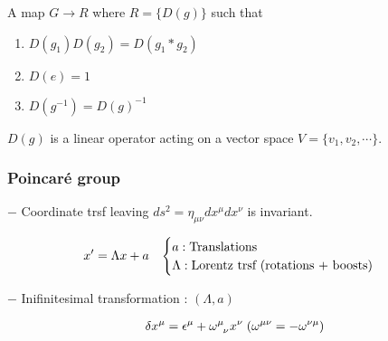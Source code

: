 \documentclass[11pt,letterpaper]{article}
\begin{document}
\VS

\begin{definition}[Representation]
	A map $G \rightarrow R$ where $R = \{D(g)\}$ such that
	\begin{enumerate}
		\item $D(g_1)D(g_2) = D(g_1*g_2)$
		\item $D(e) = 1$
		\item $D(g^{-1}) = D(g)^{-1}$
	\end{enumerate}
	
	$D(g)$ is a linear operator acting on a vector space
	$V=\{v_1, v_2, \cdots \}$.
\end{definition}

\VS\VS

\subsubsection{Poincar\'{e} group}

\vs

{$-$ Coordinate trsf leaving $ds^2 = \eta_{\mu\nu}dx^\mu dx^\nu$ is invariant.}

$$
x'=\Lambda x + a \hspace{0.3cm}
\begin{cases}
	a: \text{Translations} \\
	\Lambda: \text{Lorentz trsf (rotations + boosts)}
\end{cases}
$$
\newpage

$-$ Inifinitesimal transformation : $(\Lambda, a)$

\begin{equation}
\begin{aligned}
	\delta x^\mu = \eps^\mu + \tensor{\omega}{^\mu _\nu}x^\nu \hs (\omega^{\mu\nu} = -\omega^{\nu\mu})
\end{aligned}
\end{equation}
\end{document}
